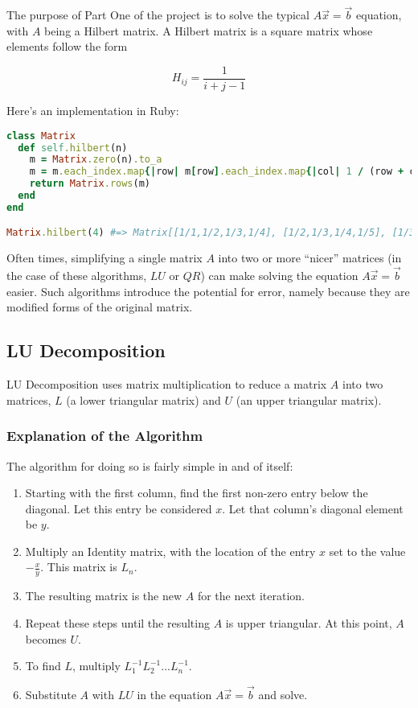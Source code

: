 \documentclass[letterpaper,12pt]{article}
\begin{document}

The purpose of Part One of the project is to solve the typical
$A\vec{x} = \vec{b}$ equation, with $A$ being a Hilbert matrix.
A Hilbert matrix is a square matrix whose elements follow the form

\[H_{ij} = \frac{1}{i + j - 1}\]

Here's an implementation in Ruby:

\lstset{caption=Hilbert Matrix Implementation}
\begin{lstlisting}[language=ruby]
class Matrix
  def self.hilbert(n)
    m = Matrix.zero(n).to_a
    m = m.each_index.map{|row| m[row].each_index.map{|col| 1 / (row + col + 1)}}
    return Matrix.rows(m)
  end
end

Matrix.hilbert(4) #=> Matrix[[1/1,1/2,1/3,1/4], [1/2,1/3,1/4,1/5], [1/3,1/4,1/5,1/6], [1/4,1/5,1/6,1/7]]
\end{lstlisting}

Often times, simplifying a single matrix $A$ into two or more ``nicer'' matrices
(in the case of these algorithms, $LU$ or $QR$) can make solving the equation
$A\vec{x}=\vec{b}$ easier.
Such algorithms introduce the potential for error, namely because they are
modified forms of the original matrix.

\subsection{LU Decomposition}

LU Decomposition uses matrix multiplication to reduce a matrix $A$ into two
matrices, $L$ (a lower triangular matrix) and $U$ (an upper triangular matrix).

\subsubsection{Explanation of the Algorithm}

The algorithm for doing so is fairly simple in and of itself:

\begin{enumerate}
\item Starting with the first column, find the first non-zero entry below the
  diagonal. Let this entry be considered $x$. Let that column's diagonal element
  be $y$.
\item Multiply an Identity matrix, with the location of the entry $x$ set to the
  value $-\frac{x}{y}$. This matrix is $L_n$.
\item The resulting matrix is the new $A$ for the next iteration.
\item Repeat these steps until the resulting $A$ is upper triangular.
  At this point, $A$ becomes $U$.
\item To find $L$, multiply $L_1^{-1}L_2^{-1} ... L_n^{-1}$.
\item Substitute $A$ with $LU$ in the equation $A\vec{x}=\vec{b}$ and solve.
\end{enumerate}
\end{document}
